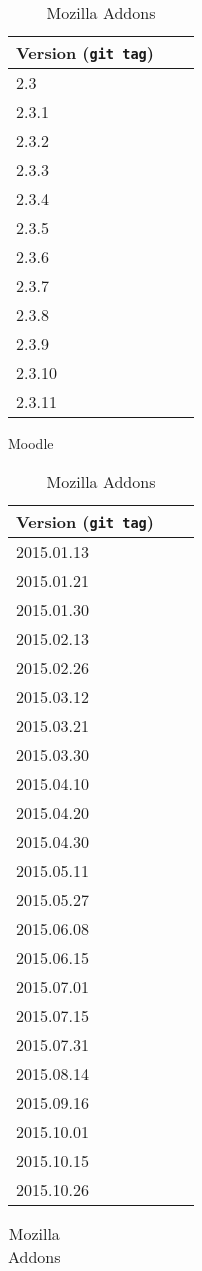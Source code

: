 \begin{table}[h!]
\parbox{.5\linewidth}{
\centering
\begin{tabular}{l*{1}{l}r}
\hline
Version (\texttt{git tag}) \\
\hline
2.3 \\
2.3.1	\\
2.3.2	\\
2.3.3	\\
2.3.4	\\
2.3.5	\\
2.3.6	\\
2.3.7	\\
2.3.8	\\
2.3.9	\\
2.3.10 \\
2.3.11 \\
\hline
\end{tabular}
\caption{Moodle}
\label{moodle}
}
\parbox{.5\linewidth}{
\centering
\begin{tabular}{l*{1}{l}r}
\hline
Version (\texttt{git tag}) \\
\hline
2015.01.13    \\
2015.01.21    \\
2015.01.30    \\
2015.02.13    \\
2015.02.26    \\
2015.03.12    \\
2015.03.21    \\
2015.03.30    \\
2015.04.10    \\
2015.04.20    \\
2015.04.30    \\
2015.05.11    \\
2015.05.27    \\
2015.06.08    \\
2015.06.15    \\
2015.07.01    \\
2015.07.15    \\
2015.07.31    \\
2015.08.14    \\
2015.09.16    \\
2015.10.01    \\
2015.10.15    \\
2015.10.26    \\
\hline
\end{tabular}
\caption{Mozilla Addons}
\label{amo}
}
\hfill
\parbox{.45\linewidth}{
\centering
\begin{tabular}{l*{1}{l}r}

\end{tabular}}
\end{table}

